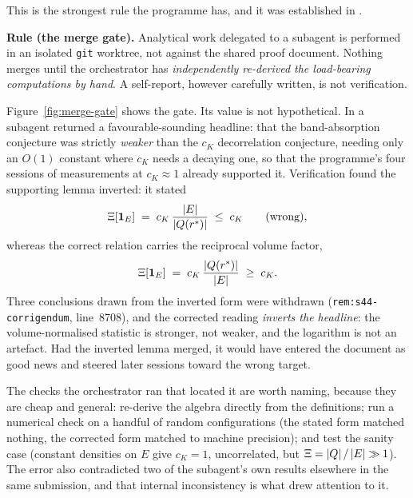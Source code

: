 This is the strongest rule the programme has, and it was established in
.

\begin{record}
\textbf{Rule (the merge gate).} Analytical work delegated to a subagent is
performed in an isolated \texttt{git} worktree, not against the shared proof
document. Nothing merges until the orchestrator has \emph{independently
re-derived the load-bearing computations by hand}. A self-report, however
carefully written, is not verification.
\end{record}

Figure~\ref{fig:merge-gate} shows the gate. Its value is not hypothetical. In
 a subagent returned a favourable-sounding headline: that the
band-absorption conjecture was strictly \emph{weaker} than the \(c_K\)
decorrelation conjecture, needing only an \(O(1)\) constant where \(c_K\)
needs a decaying one, so that the programme's four sessions of measurements at
\(c_K\approx1\) already supported it. Verification found the supporting lemma
inverted: it stated
\[
  \Xi[\mathbf 1_E] \;=\; c_K\,\frac{\left|E\right|}{\left|Q(r^{*})\right|} \;\le\; c_K
  \qquad\text{(wrong)},
\]
whereas the correct relation carries the reciprocal volume factor,
\[
  \Xi[\mathbf 1_E] \;=\; c_K\,\frac{\left|Q(r^{*})\right|}{\left|E\right|} \;\ge\; c_K .
\]
Three conclusions drawn from the inverted form were withdrawn
(\texttt{rem:s44-corrigendum}, line~8708), and the corrected reading
\emph{inverts the headline}: the volume-normalised statistic is stronger, not
weaker, and the logarithm is not an artefact. Had the inverted lemma merged,
it would have entered the document as good news and steered later sessions
toward the wrong target.

The checks the orchestrator ran that located it are worth naming, because they
are cheap and general: re-derive the algebra directly from the definitions; run
a numerical check on a handful of random configurations (the stated form
matched nothing, the corrected form matched to machine precision); and test
the sanity case (constant densities on \(E\) give \(c_K=1\), uncorrelated, but
\(\Xi=\left|Q\right|/\left|E\right|\gg1\)). The error also contradicted two of the
subagent's own results elsewhere in the same submission, and that internal
inconsistency is what drew attention to it.

